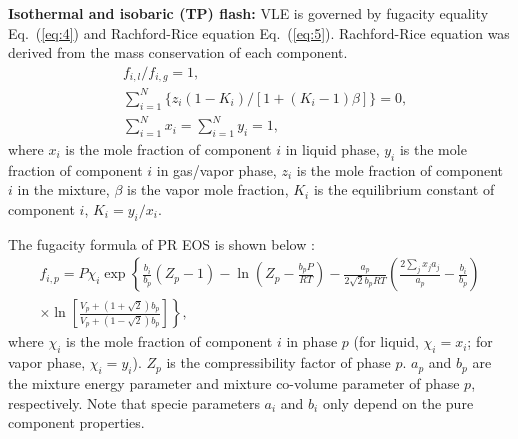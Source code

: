 \textbf{Isothermal and isobaric (TP) flash:}
VLE is governed by fugacity equality Eq.~(\ref{eq:4}) and Rachford-Rice equation \cite{rachford1952procedure} Eq.~(\ref{eq:5}). Rachford-Rice equation was derived from the mass conservation of each component.
\begin{align}
&f_{i, l}\big/f_{i, g}=1,  \label{eq:4} \\
&\sum_{i=1}^{N}\bigg\{z_i\left(1-K_i\right)\bigg/\left[1+\left(K_i-1\right)\beta\right]\bigg\}=0, \label{eq:5} \\
&\sum_{i=1}^{N}x_i=\sum_{i=1}^{N}y_i=1,  \label{eq:5-2}
\end{align}
where $x_i$ is the mole fraction of component $i$ in liquid phase, $y_i$ is the mole fraction of component $i$ in gas/vapor phase, $z_i$ is the mole fraction of component $i$ in the mixture, $\beta$ is the vapor mole fraction, $K_i$ is the equilibrium constant of component $i$, $K_i=y_i/x_i$. %




 
The fugacity formula of PR EOS is shown below \cite{yi2019multicomponent}:
\begin{align}
f_{i,p}=P \chi_i \exp \left\{\frac{b_i}{b_p}(Z_p - 1) - \ln(Z_p-\frac{b_p P}{RT}) - \frac{a_p} {2\sqrt{2} b_p R T} \left(\frac{2 \sum_j {x_j a_j} } {a_p} - \frac {b_i} {b_p}\right) \right. \nonumber\\
\left.\times \ln\left[\frac{V_p + \left(1+\sqrt{2}\right)b_p} {V_p + \left(1-\sqrt{2}\right) b_p}\right]\right\}, \label{fuga}
\end{align}
where $\chi_i$ is the mole fraction of component $i$ in phase $p$ (for liquid, $\chi_i=x_i$; for vapor phase, $\chi_i=y_i$). $Z_p$ is the compressibility factor of phase $p$. $a_p$ and $b_p$ are the mixture energy parameter and mixture co-volume parameter of phase $p$, respectively. Note that specie parameters $a_i$ and $b_i$ only depend on the pure component properties.


